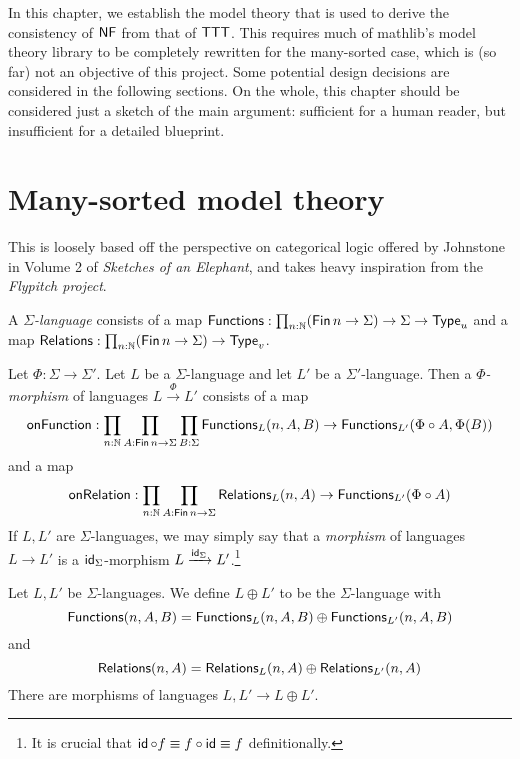 In this chapter, we establish the model theory that is used to derive the consistency of \( \mathsf{NF} \) from that of \( \mathsf{TTT} \).
This requires much of mathlib's model theory library to be completely rewritten for the many-sorted case, which is (so far) not an objective of this project.
Some potential design decisions are considered in the following sections.
On the whole, this chapter should be considered just a sketch of the main argument: sufficient for a human reader, but insufficient for a detailed blueprint.

\section{Many-sorted model theory}
This is loosely based off the perspective on categorical logic offered by Johnstone in Volume 2 of \emph{Sketches of an Elephant}, and takes heavy inspiration from the \emph{Flypitch project}.
\begin{definition}
  A \emph{\( \Sigma \)-language} consists of a map \( \operatorname{\mathsf{Functions}} : \prod_{n : \mathbb N} (\operatorname{\mathsf{Fin}} n \to \Sigma) \to \Sigma \to \mathsf{Type}_u \) and a map \( \operatorname{\mathsf{Relations}} : \prod_{n : \mathbb N} (\operatorname{\mathsf{Fin}} n \to \Sigma) \to \mathsf{Type}_v \).
\end{definition}
\begin{definition}
  Let \( \Phi : \Sigma \to \Sigma' \).
  Let \( L \) be a \( \Sigma \)-language and let \( L' \) be a \( \Sigma' \)-language.
  Then a \emph{\( \Phi \)-morphism} of languages \( L \xrightarrow\Phi L' \) consists of a map
  \[ \operatorname{\mathsf{onFunction}} : \prod_{n : \mathbb N} \prod_{A : \operatorname{\mathsf{Fin}} n \to \Sigma} \prod_{B : \Sigma} \operatorname{\mathsf{Functions}}_L(n, A, B) \to \operatorname{\mathsf{Functions}}_{L'}(\Phi \circ A, \Phi(B)) \]
  and a map
  \[ \operatorname{\mathsf{onRelation}} : \prod_{n : \mathbb N} \prod_{A : \operatorname{\mathsf{Fin}} n \to \Sigma} \operatorname{\mathsf{Relations}}_L(n, A) \to \operatorname{\mathsf{Functions}}_{L'}(\Phi \circ A) \]
  If \( L, L' \) are \( \Sigma \)-languages, we may simply say that a \emph{morphism} of languages \( L \to L' \) is a \( \operatorname{\mathsf{id}}_\Sigma \)-morphism \( L \xrightarrow{\operatorname{\mathsf{id}}_\Sigma} L' \).\footnote{It is crucial that \( \operatorname{\mathsf{id}} \circ f \equiv f \circ \operatorname{\mathsf{id}} \equiv f \) definitionally.}
\end{definition}
\begin{definition}
  Let \( L, L' \) be \( \Sigma \)-languages.
  We define \( L \oplus L' \) to be the \( \Sigma \)-language with
  \[ \operatorname{\mathsf{Functions}}(n, A, B) = \operatorname{\mathsf{Functions}}_L(n, A, B) \oplus \operatorname{\mathsf{Functions}}_{L'}(n, A, B) \]
  and
  \[ \operatorname{\mathsf{Relations}}(n, A) = \operatorname{\mathsf{Relations}}_L(n, A) \oplus \operatorname{\mathsf{Relations}}_{L'}(n, A) \]
  There are morphisms of languages \( L, L' \to L \oplus L' \).
\end{definition}

